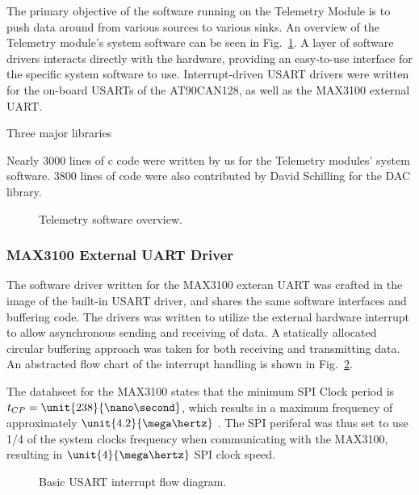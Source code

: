 The primary objective of the software running on the Telemetry Module is to push data around from various sources to various sinks. An overview of the Telemetry module's system software can be seen in Fig.\ \ref{fig:telemetry_software_implementation}. A layer of software drivers interacts directly with the hardware, providing an easy-to-use interface for the specific system software to use. Interrupt-driven USART drivers were written for the on-board USARTs of the AT90CAN128, as well as the MAX3100 external UART.

Three major libraries 

Nearly 3000 lines of c code were written by us for the Telemetry modules' system software. 3800 lines of code were also contributed by David Schilling for the DAC library.

\begin{figure}[H]
\centering

\caption{Telemetry software overview.}
\label{fig:telemetry_software_implementation}
\end{figure}

\subsubsection{MAX3100 External UART Driver}

The software driver written for the MAX3100 exteran UART was crafted in the image of the built-in USART driver, and shares the same software interfaces and buffering code. The drivers was written to utilize the external hardware interrupt to allow asynchronous sending and receiving of data. A statically allocated circular buffering approach was taken for both receiving and transmitting data. An abstracted flow chart of the interrupt handling is shown in Fig.\ \ref{fig:usart_driver_flow}.

The datahseet for the MAX3100 states that the minimum SPI Clock period is $t_{CP}=\unit{238}{\nano\second}$, which results in a maximum frequency of approximately $\unit{4.2}{\mega\hertz}$ \cite{MAX3100}. The SPI periferal was thus set to use 1/4 of the system clocks frequency when communicating with the MAX3100, resulting in $\unit{4}{\mega\hertz}$ SPI clock speed.

\begin{figure}[H]
\centering

\caption{Basic USART interrupt flow diagram.}
\label{fig:usart_driver_flow}
\end{figure}


